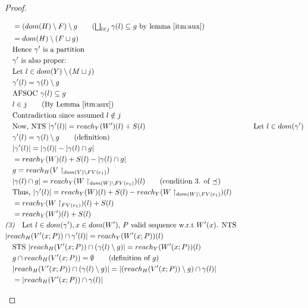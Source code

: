 \documentclass[11pt]{article}
\theoremstyle{definition}
\begin{document}
\begin{proof}
\begin{description}
\begin{align*}
		&\quad = (dom(H) \setminus F) \setminus g 
			\tag{$\bigsqcup_{l \in j} \gamma(l) \subseteq g$ by lemma \ref{itm:aux}}\\
		&\quad = dom(H) \setminus (F \sqcup g)\\
		&\quad \text{Hence } \gamma' \text{ is a partition}\\
		&\quad \gamma' \text{ is also proper: }\\
		&\quad \text{Let } l \in dom(Y) \setminus (M \sqcup j)\\
		&\quad \gamma'(l) = \gamma(l) \setminus g\\
		&\quad \text{AFSOC } \gamma(l) \subseteq g\\ 
		&\quad l \in j \tag{By Lemma \ref{itm:aux}}\\
		&\quad \text{Contradiction since assumed } l \notin j\\ 
		&\quad \text{Now, NTS } |\gamma'(l)| = reach_{Y}(W')(l) + S(l)
		&\quad \text{Let } l \in dom(\gamma')\\
		&\quad \gamma'(l) = \gamma(l) \setminus g \tag{definition}\\ 
		&\quad |\gamma'(l)| = |\gamma(l)| - |\gamma(l) \cap g|\\
		&\quad = reach_Y(W)(l) + S(l) - |\gamma(l) \cap g|\\
		&\quad g = reach_H(V\restriction_{dom(V) \setminus FV(e_1)})\\
		&\quad |\gamma(l) \cap g| = reach_Y(W\restriction_{dom(W)\setminus FV(e_1)})(l) 
			\tag{condition 3. of $\preceq$}\\
		&\quad \text{Thus, } |\gamma'(l)| = 
			reach_Y(W)(l) + S(l) - reach_Y(W\restriction_{dom(W)\setminus FV(e_1)})(l)\\
		&\quad = reach_Y(W\restriction_{FV(e_1)})(l) +  S(l)\\
		&\quad = reach_Y(W')(l) +  S(l)\\
		&\emph{(3)}\quad \text{Let $l \in dom(\gamma'), x \in dom(W')$, 
			$P$ valid sequence w.r.t $W'(x)$. NTS }\\ 
		&|reach_{H}(V'(x;P)) \cap \gamma'(l)| = reach_{Y}(W'(x;P))(l)\\ 
		&\quad \text{STS } |reach_{H}(V'(x;P)) \cap (\gamma(l) \setminus g)| = reach_{Y}(W'(x;P))(l) \\
		&\quad g \cap reach_H(V'(x;P)) = \emptyset \tag{definition of $g$}\\
		&\quad |reach_{H}(V'(x;P)) \cap (\gamma(l) \setminus g)| = 
				|(reach_{H}(V'(x;P)) \setminus g) \cap \gamma(l)|\\
		&\quad = |reach_{H}(V'(x;P)) \cap \gamma(l)|\\

\end{align*}
\end{description}
\end{proof}
\end{document}
